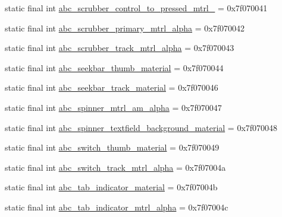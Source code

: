 \begin{DoxyCompactItemize}
\item 
static final int \mbox{\hyperlink{classcom_1_1google_1_1android_1_1gms_1_1R_1_1drawable_a54f7c16ee7490a4b78a4fdb158b27c4e}{abc\+\_\+scrubber\+\_\+control\+\_\+to\+\_\+pressed\+\_\+mtrl\+\_}} = 0x7f070041
\item 
static final int \mbox{\hyperlink{classcom_1_1google_1_1android_1_1gms_1_1R_1_1drawable_a09a63ecb152dddb54388063bae722873}{abc\+\_\+scrubber\+\_\+primary\+\_\+mtrl\+\_\+alpha}} = 0x7f070042
\item 
static final int \mbox{\hyperlink{classcom_1_1google_1_1android_1_1gms_1_1R_1_1drawable_a4fbf620d956ce680db9c0c2c2e3f4e3f}{abc\+\_\+scrubber\+\_\+track\+\_\+mtrl\+\_\+alpha}} = 0x7f070043
\item 
static final int \mbox{\hyperlink{classcom_1_1google_1_1android_1_1gms_1_1R_1_1drawable_a1a0b0b2b605c57f0824bc169642b12b9}{abc\+\_\+seekbar\+\_\+thumb\+\_\+material}} = 0x7f070044
\item 
static final int \mbox{\hyperlink{classcom_1_1google_1_1android_1_1gms_1_1R_1_1drawable_ac75e21dde40fb90d40d6e2f7e9090aa6}{abc\+\_\+seekbar\+\_\+track\+\_\+material}} = 0x7f070046
\item 
static final int \mbox{\hyperlink{classcom_1_1google_1_1android_1_1gms_1_1R_1_1drawable_aa64b2a4b54290d20a58489756356982e}{abc\+\_\+spinner\+\_\+mtrl\+\_\+am\+\_\+alpha}} = 0x7f070047
\item 
static final int \mbox{\hyperlink{classcom_1_1google_1_1android_1_1gms_1_1R_1_1drawable_afe5dfade8e6ee0c09b52ad062a7f5e3c}{abc\+\_\+spinner\+\_\+textfield\+\_\+background\+\_\+material}} = 0x7f070048
\item 
static final int \mbox{\hyperlink{classcom_1_1google_1_1android_1_1gms_1_1R_1_1drawable_a79dcafe9602e996126175096aaeee07d}{abc\+\_\+switch\+\_\+thumb\+\_\+material}} = 0x7f070049
\item 
static final int \mbox{\hyperlink{classcom_1_1google_1_1android_1_1gms_1_1R_1_1drawable_a141b0056b7d112f7c18cd3dba3a89b70}{abc\+\_\+switch\+\_\+track\+\_\+mtrl\+\_\+alpha}} = 0x7f07004a
\item 
static final int \mbox{\hyperlink{classcom_1_1google_1_1android_1_1gms_1_1R_1_1drawable_a5f7822852a459139001f871a313fd6df}{abc\+\_\+tab\+\_\+indicator\+\_\+material}} = 0x7f07004b
\item 
static final int \mbox{\hyperlink{classcom_1_1google_1_1android_1_1gms_1_1R_1_1drawable_acf7782f1b134b56d78857d93861d650f}{abc\+\_\+tab\+\_\+indicator\+\_\+mtrl\+\_\+alpha}} = 0x7f07004c
\item 

\end{DoxyCompactItemize}
